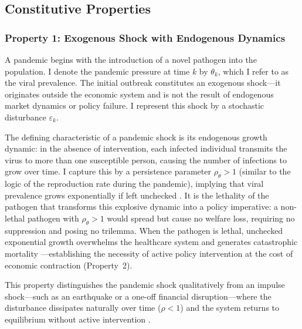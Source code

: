 \documentclass[12pt, a4paper]{article}
\begin{document}

\subsection{Constitutive Properties}
\label{subsec:properties}


\subsubsection*{Property 1: Exogenous Shock with Endogenous Dynamics}


A pandemic begins with the introduction of a novel pathogen into the population. I denote the pandemic pressure at time $k$ by $\theta_k$, which I refer to as the viral prevalence. The initial outbreak constitutes an exogenous shock---it originates outside the economic system and is not the result of endogenous market dynamics or policy failure. I represent this shock by a stochastic disturbance $\varepsilon_k$.

The defining characteristic of a pandemic shock is its endogenous growth dynamic: in the absence of intervention, each infected individual transmits the virus to more than one susceptible person, causing the number of infections to grow over time. I capture this by a persistence parameter $\rho_\theta > 1$ (similar to the logic of the reproduction rate during the pandemic), implying that viral prevalence grows exponentially if left unchecked \citep{Atkeson2020, alvarez2021, eichenbaum2021macro}. It is the lethality of the pathogen that transforms this explosive dynamic into a policy imperative: a non-lethal pathogen with $\rho_\theta > 1$ would spread but cause no welfare loss, requiring no suppression and posing no trilemma. When the pathogen is lethal, unchecked exponential growth overwhelms the healthcare system and generates catastrophic mortality \citep{Jones2021, Barro2020}---establishing the necessity of active policy intervention at the cost of economic contraction (Property~2).

This property distinguishes the pandemic shock qualitatively from an impulse shock---such as an earthquake or a one-off financial disruption---where the disturbance dissipates naturally over time ($\rho < 1$) and the system returns to equilibrium without active intervention \citep{jorda2022longer}.
\end{document}
